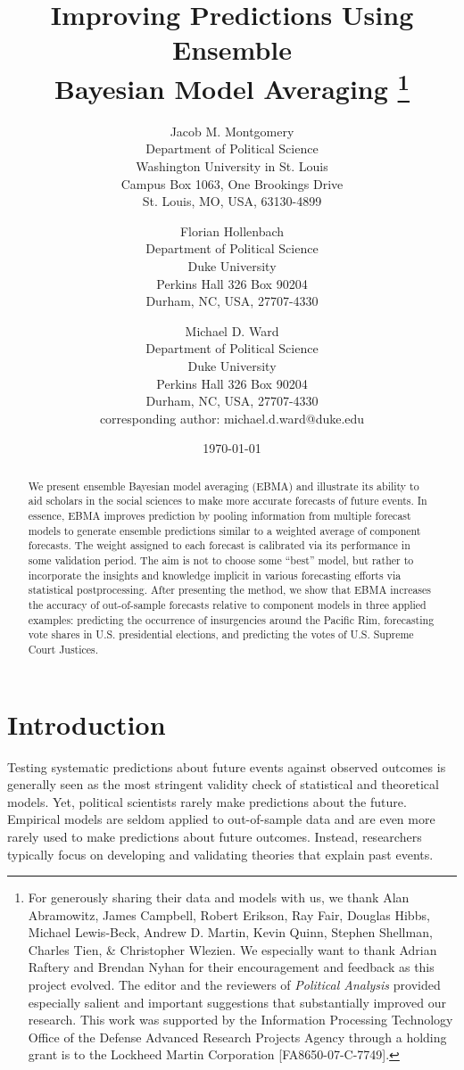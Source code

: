 \documentclass[12pt,fullpage,endnotes]{article}
\title{Improving Predictions Using Ensemble \\ Bayesian Model
  Averaging \thanks{For generously sharing their data and models with
    us, we thank Alan Abramowitz, James Campbell, Robert Erikson, Ray
    Fair, Douglas Hibbs, Michael Lewis-Beck, Andrew D. Martin, Kevin
    Quinn, Stephen Shellman, Charles Tien, \& Christopher Wlezien.
    We especially want to thank Adrian Raftery and Brendan Nyhan for their
    encouragement and feedback as this project evolved. The editor and the reviewers of {\em Political Analysis}
    provided especially salient and important suggestions that substantially improved our research.
   This work was supported by the Information Processing Technology Office of the
    Defense Advanced Research Projects Agency through a
    holding grant is to the Lockheed Martin Corporation [FA8650-07-C-7749].}}
\author{
Jacob M. Montgomery\\
	Department of Political Science\\
	Washington University in St. Louis\\
	Campus Box 1063, One Brookings Drive\\
	St. Louis, MO, USA, 63130-4899 
	\and
Florian Hollenbach  \\
	Department of Political Science\\
	Duke University\\
	Perkins Hall 326 Box 90204\\
	Durham, NC, USA, 27707-4330
	\and
Michael D. Ward\\
	Department of Political Science\\
	Duke University\\
	Perkins Hall 326 Box 90204\\
	Durham, NC, USA, 27707-4330\\
	corresponding author: michael.d.ward@duke.edu
}
\date{\today}
\begin{document}
\maketitle
\thispagestyle{empty}
\clearpage
\pagestyle{myheadings}
\newpage
\singlespacing

\thispagestyle{empty}


\begin{abstract}
\begin{doublespace}
 We present ensemble Bayesian model averaging (EBMA) and illustrate
  its ability to aid scholars in the social sciences to make more
  accurate forecasts of future events.  In essence, EBMA improves
  prediction by pooling information from multiple forecast models to
  generate ensemble predictions similar to a weighted average of
  component forecasts. The weight assigned to each forecast is
  calibrated via its performance in some validation period. The aim is
  not to choose some ``best'' model, but rather to incorporate the
  insights and knowledge implicit in various forecasting efforts via
  statistical postprocessing.  After presenting the method, we show
  that EBMA increases the accuracy of out-of-sample forecasts relative
  to component models in three applied examples: predicting the
  occurrence of insurgencies around the Pacific Rim, forecasting vote
  shares in U.S. presidential elections, and predicting the votes of
  U.S. Supreme Court Justices.
  \end{doublespace}
\end{abstract}

\doublespacing
\newpage

\setcounter{page}{1}

\section{Introduction}
Testing systematic predictions about future events against observed
outcomes is generally seen as the most stringent validity check of
statistical and theoretical models.  Yet, political scientists rarely
make predictions about the future.  Empirical models are seldom
applied to out-of-sample data and are even more rarely used to make
predictions about future outcomes. Instead, researchers typically
focus on developing and validating theories that explain past events.
\end{document}
